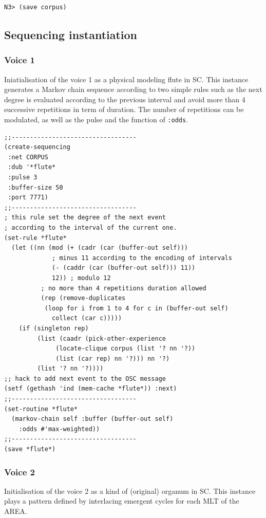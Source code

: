 \documentclass{article}
\begin{document}
\begin{lstlisting}[language=N3]
N3> (save corpus)
\end{lstlisting}

\subsection{Sequencing instantiation}

\subsubsection{Voice 1}

Iniatialisation of the voice 1 as a physical modeling flute in SC. This instance generates a Markov chain sequence according to two simple rules such as the next degree is evaluated according to the previous interval and avoid more than 4 successive repetitions in term of duration. The number of repetitions can be modulated, as well as the pulse and the function of \texttt{:odds}.

\begin{lstlisting}[language=N3]
;;----------------------------------
(create-sequencing
 :net CORPUS
 :dub '*flute*
 :pulse 3
 :buffer-size 50
 :port 7771)
;;----------------------------------
; this rule set the degree of the next event 
; according to the interval of the current one.
(set-rule *flute* 
  (let ((nn (mod (+ (cadr (car (buffer-out self)))
		     ; minus 11 according to the encoding of intervals
		     (- (caddr (car (buffer-out self))) 11))
		     12)) ; modulo 12
	      ; no more than 4 repetitions duration allowed	 
	      (rep (remove-duplicates
	       (loop for i from 1 to 4 for c in (buffer-out self)
		     collect (car c)))))
    (if (singleton rep)
	     (list (caadr (pick-other-experience
		      (locate-clique corpus (list '? nn '?))
		      (list (car rep) nn '?))) nn '?)
	     (list '? nn '?))))
;; hack to add next event to the OSC message	
(setf (gethash 'ind (mem-cache *flute*)) :next)
;;----------------------------------
(set-routine *flute*   
  (markov-chain self :buffer (buffer-out self) 
    :odds #'max-weighted))
;;----------------------------------
(save *flute*)
\end{lstlisting}

\subsubsection{Voice 2}

Initialisation of the voice 2 as a kind of (original) organum in SC. This instance plays a pattern defined by interlacing emergent cycles for each MLT of the AREA.
\end{document}
